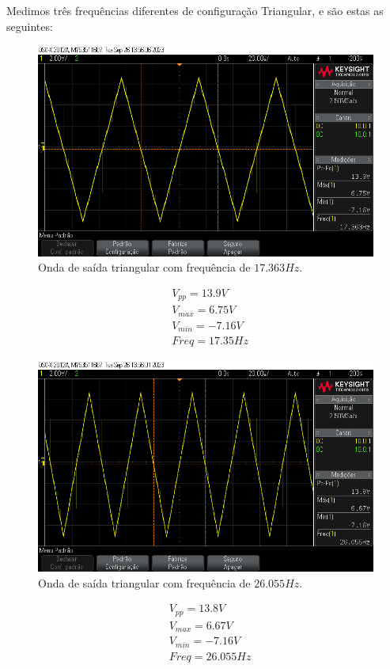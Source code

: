 Medimos três frequências diferentes de configuração Triangular, e são estas as seguintes:

\begin{figure}[H]
    \centering
    \includegraphics[width=0.5\columnwidth]{images/triangular_2.png}
    \caption{Onda de saída triangular com frequência de $17.363Hz$.}
\end{figure}

\begin{equation}
    \begin{aligned}
         & V_{pp} = 13.9 V    \\
         & V_{max} = 6.75 V   \\
         & V_{min} =  -7.16 V \\
         & Freq = 17.35 Hz
    \end{aligned}
\end{equation}

\begin{figure}[H]
    \centering
    \includegraphics[width=0.5\columnwidth]{images/triangular_1.png}
    \caption{Onda de saída triangular com frequência de $26.055Hz$.}
\end{figure}

\begin{equation}
    \begin{aligned}
         & V_{pp} = 13.8 V    \\
         & V_{max} = 6.67 V   \\
         & V_{min} =  -7.16 V \\
         & Freq = 26.055 Hz
    \end{aligned}
\end{equation}

